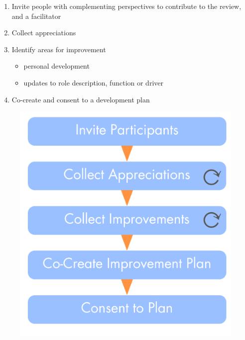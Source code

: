 \begin{enumerate}
\item Invite people with complementing perspectives to contribute to the review, and a facilitator

\item Collect appreciations

\item Identify areas for improvement

\begin{itemize}
\item personal development

\item updates to role description, function or driver

\end{itemize}

\item Co-create and consent to a development plan

\end{enumerate}

\begin{figure}[htbp]
\centering
\includegraphics[keepaspectratio,width=\textwidth,height=0.75\textheight]{img/people-and-roles/effectiveness-review.png}
\end{figure}

